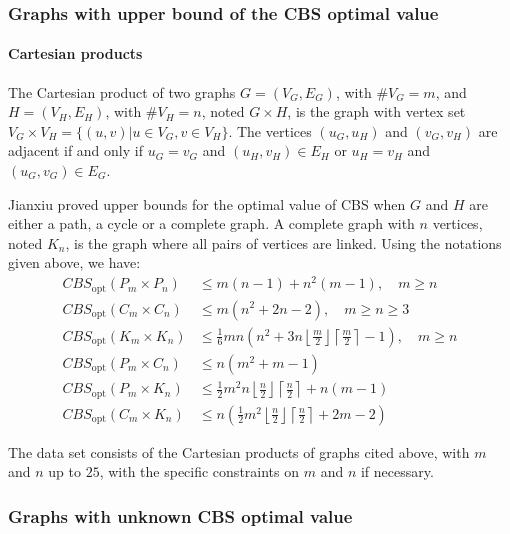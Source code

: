 \documentclass{scrartcl}
\theoremstyle{plain}
\newcommand{\cbs}{CBS}
\begin{document}
\subsubsection{Graphs with upper bound of the \cbs{} optimal value}


\paragraph{\textbf{Cartesian products}}
The Cartesian product of two graphs $G = (V_G, E_G)$, with $\#V_G = m$, and $H = 
(V_H, E_H)$, with $\#V_H = n$, noted $G \times H$, is the graph with vertex set 
$V_G \times V_H = \{(u, v) | u \in V_G, v \in V_H\}$. The vertices $(u_G, u_H)$ 
and $(v_G, v_H)$ are adjacent if and only if $u_G = v_G$ and $(u_H, v_H) \in 
E_H$ or $u_H = v_H$ and $(u_G, v_G) \in E_G$.

Jianxiu \cite{Jianxiu2001} proved upper bounds for the optimal value of \cbs{} 
when $G$ and $H$ are either a path, a cycle or a complete graph. A complete 
graph with $n$ vertices, noted $K_n$, is the graph where all pairs of 
vertices are linked. Using the notations given above, we have:
\begin{align}
\cbs{}_{\text{opt}}(P_m \times P_n) &\leq m(n-1) + n^2(m-1), \quad{} m\geq n \\
\cbs{}_{\text{opt}}(C_m \times C_n)&\leq m(n^2+2n-2), \quad{} m\geq n\geq 3 \\
\cbs{}_{\text{opt}}(K_m \times K_n)&\leq \frac{1}{6}mn\left(n^2 + 3n 
\left\lfloor 
\frac{m}{2} \right\rfloor \left\lceil \frac{m}{2} \right\rceil - 1 \right), 
\quad m\geq n \\
\cbs{}_{\text{opt}}(P_m \times C_n)&\leq n(m^2 + m - 1) \\
\cbs{}_{\text{opt}}(P_m \times K_n)&\leq \frac{1}{2}m^2n \left\lfloor 
\frac{n}{2} 
\right \rfloor \left\lceil \frac{n}{2} \right\rceil + n(m-1) \\
\cbs{}_{\text{opt}}(C_m \times K_n)&\leq n \left( 
\frac{1}{2}m^2\left\lfloor\frac{n}{2}\right\rfloor 
\left\lceil\frac{n}{2}\right\rceil + 2m-2 \right)
\end{align}

The data set consists of the Cartesian products of graphs cited above, with $m$ 
and $n$ up to $25$, with the specific constraints on $m$ and $n$ if necessary.

\subsubsection{Graphs with unknown \cbs{} optimal value}
\end{document}

